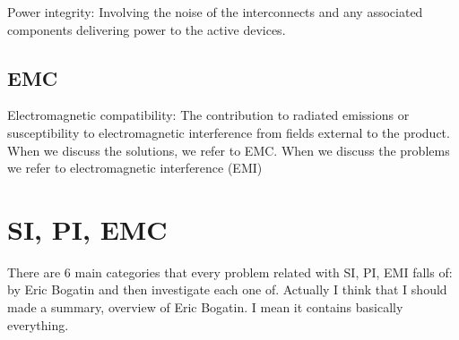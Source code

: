 \documentclass[12pt]{article}
\begin{document}
Power integrity: Involving the noise of the interconnects and any associated components delivering power to the active devices. 

\subsection{EMC}

Electromagnetic compatibility: The contribution to radiated emissions or susceptibility to electromagnetic interference from fields external to the product. When we discuss the solutions, we refer to EMC. When we discuss the problems we refer to electromagnetic interference (EMI)

\section{SI, PI, EMC}

There are 6 main categories that every problem related with SI, PI, EMI falls of: by Eric Bogatin and then investigate each one of. Actually I think that I should made a summary, overview of Eric Bogatin. I mean it contains basically everything.
\end{document}
